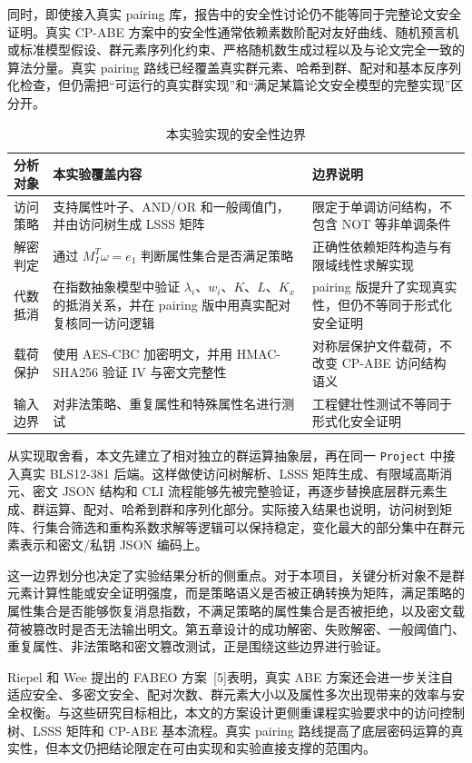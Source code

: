 同时，即使接入真实 pairing 库，报告中的安全性讨论仍不能等同于完整论文安全证明。真实 CP-ABE 方案中的安全性通常依赖素数阶配对友好曲线、随机预言机或标准模型假设、群元素序列化约束、严格随机数生成过程以及与论文完全一致的算法分量。真实 pairing 路线已经覆盖真实群元素、哈希到群、配对和基本反序列化检查，但仍需把“可运行的真实群实现”和“满足某篇论文安全模型的完整实现”区分开。

\begin{table}[H]
\centering
\caption{本实验实现的安全性边界}
\begin{tabular}{>{\raggedright\arraybackslash}p{} >{\raggedright\arraybackslash}p{} >{\raggedright\arraybackslash}p{}}
\toprule
分析对象 & 本实验覆盖内容 & 边界说明 \\
\midrule
访问策略 & 支持属性叶子、AND/OR 和一般阈值门，并由访问树生成 LSSS 矩阵 & 限定于单调访问结构，不包含 NOT 等非单调条件 \\
解密判定 & 通过 $M_I^T\omega=e_1$ 判断属性集合是否满足策略 & 正确性依赖矩阵构造与有限域线性求解实现 \\
代数抵消 & 在指数抽象模型中验证 $\lambda_i$、$w_i$、$K$、$L$、$K_x$ 的抵消关系，并在 pairing 版中用真实配对复核同一访问逻辑 & pairing 版提升了实现真实性，但仍不等同于形式化安全证明 \\
载荷保护 & 使用 AES-CBC 加密明文，并用 HMAC-SHA256 验证 IV 与密文完整性 & 对称层保护文件载荷，不改变 CP-ABE 访问结构语义 \\
输入边界 & 对非法策略、重复属性和特殊属性名进行测试 & 工程健壮性测试不等同于形式化安全证明 \\
\bottomrule
\end{tabular}
\end{table}

从实现取舍看，本文先建立了相对独立的群运算抽象层，再在同一 \verb|Project| 中接入真实 BLS12-381 后端。这样做使访问树解析、LSSS 矩阵生成、有限域高斯消元、密文 JSON 结构和 CLI 流程能够先被完整验证，再逐步替换底层群元素生成、群运算、配对、哈希到群和序列化部分。实际接入结果也说明，访问树到矩阵、行集合筛选和重构系数求解等逻辑可以保持稳定，变化最大的部分集中在群元素表示和密文/私钥 JSON 编码上。

这一边界划分也决定了实验结果分析的侧重点。对于本项目，关键分析对象不是群元素计算性能或安全证明强度，而是策略语义是否被正确转换为矩阵，满足策略的属性集合是否能够恢复消息指数，不满足策略的属性集合是否被拒绝，以及密文载荷被篡改时是否无法输出明文。第五章设计的成功解密、失败解密、一般阈值门、重复属性、非法策略和密文篡改测试，正是围绕这些边界进行验证。

Riepel 和 Wee 提出的 FABEO 方案~[5]表明，真实 ABE 方案还会进一步关注自适应安全、多密文安全、配对次数、群元素大小以及属性多次出现带来的效率与安全权衡。与这些研究目标相比，本文的方案设计更侧重课程实验要求中的访问控制树、LSSS 矩阵和 CP-ABE 基本流程。真实 pairing 路线提高了底层密码运算的真实性，但本文仍把结论限定在可由实现和实验直接支撑的范围内。
